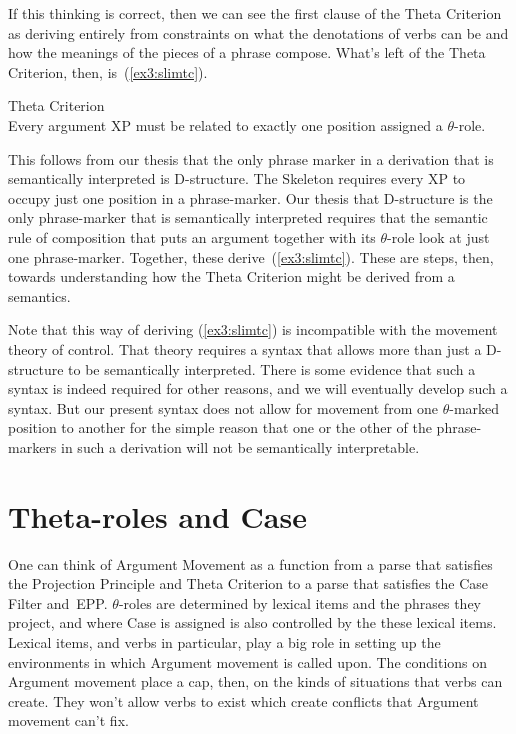 If this thinking is correct, then we can see the first clause of the Theta Criterion as deriving entirely from constraints on what the denotations of verbs can be and how the meanings of the pieces of a phrase compose. What's left of the Theta Criterion, then, is~(\ref{ex3:slimtc}).
\begin{exe}
	\raggedright
	\ex \label{ex3:slimtc} Theta Criterion\\
	Every argument XP must be related to exactly one position assigned a $\theta$-role.
\end{exe}
This follows from our thesis that the only phrase marker in a derivation that is semantically interpreted is D-structure. The  Skeleton requires every XP to occupy just one position in a phrase-marker. Our thesis that D-structure is the only phrase-marker that is semantically interpreted requires that the semantic rule of composition that puts an argument together with its $\theta$-role look at just one phrase-marker. Together, these derive~(\ref{ex3:slimtc}). These are steps, then, towards understanding how the Theta Criterion might be derived from a semantics.

Note that this way of deriving (\ref{ex3:slimtc}) is incompatible with the movement theory of control. That theory requires a syntax that allows more than just a D-structure to be semantically interpreted. There is some evidence that such a syntax is indeed required for other reasons, and we will eventually develop such a syntax. But our present syntax does not allow for movement from one $\theta$-marked position to another for the simple reason that one or the other of the phrase-markers in such a derivation will not be semantically interpretable. 

\section{Theta-roles and Case}
\label{sec:thetacase}

One can think of Argument Movement as a function from a parse that satisfies the Projection Principle and Theta Criterion to a parse that satisfies the Case Filter and~EPP. $\theta$-roles are determined by lexical items and the phrases they project, and where Case is assigned is also controlled by the these lexical items. Lexical items, and verbs in particular, play a big role in setting up the environments in which Argument movement is called upon. The conditions on Argument movement place a cap, then, on the kinds of situations that verbs can create. They won't allow verbs to exist which create conflicts that Argument movement can't fix.

